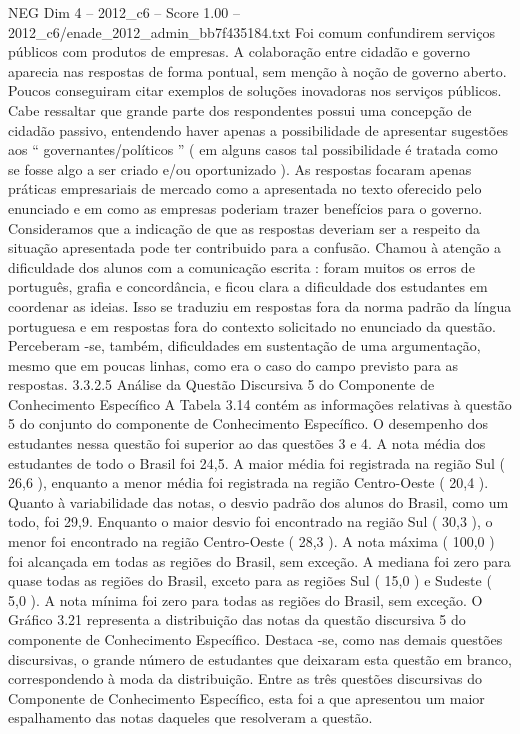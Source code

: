 \begin{textsample}{NEG Dim 4 – 2012\_c6 – Score 1.00 – 2012\_c6/enade\_2012\_admin\_bb7f435184.txt}
Foi comum confundirem serviços públicos com produtos de empresas.
A colaboração entre cidadão e governo aparecia nas respostas de forma pontual, sem menção à noção de governo aberto.
Poucos conseguiram citar exemplos de soluções inovadoras nos serviços públicos.
Cabe ressaltar que grande parte dos respondentes possui uma concepção de cidadão passivo, entendendo haver apenas a possibilidade de apresentar sugestões aos “ governantes/políticos ” ( em alguns casos tal possibilidade é tratada como se fosse algo a ser criado e/ou oportunizado ).
As respostas focaram apenas práticas empresariais de mercado como a apresentada no texto oferecido pelo enunciado e em como as empresas poderiam trazer benefícios para o governo.
Consideramos que a indicação de que as respostas deveriam ser a respeito da situação apresentada pode ter contribuido para a confusão.
Chamou à atenção a dificuldade dos alunos com a comunicação escrita : foram muitos os erros de português, grafia e concordância, e ficou clara a dificuldade dos estudantes em coordenar as ideias.
Isso se traduziu em respostas fora da norma padrão da língua portuguesa e em respostas fora do contexto solicitado no enunciado da questão.
Perceberam -se, também, dificuldades em sustentação de uma argumentação, mesmo que em poucas linhas, como era o caso do campo previsto para as respostas. 3.3.2.5 Análise da Questão Discursiva 5 do Componente de Conhecimento Específico A Tabela 3.14 contém as informações relativas à questão 5 do conjunto do componente de Conhecimento Específico.
O desempenho dos estudantes nessa questão foi superior ao das questões 3 e 4.
A nota média dos estudantes de todo o Brasil foi 24,5.
A maior média foi registrada na região Sul ( 26,6 ), enquanto a menor média foi registrada na região Centro-Oeste ( 20,4 ).
Quanto à variabilidade das notas, o desvio padrão dos alunos do Brasil, como um todo, foi 29,9.
Enquanto o maior desvio foi encontrado na região Sul ( 30,3 ), o menor foi encontrado na região Centro-Oeste ( 28,3 ).
A nota máxima ( 100,0 ) foi alcançada em todas as regiões do Brasil, sem exceção.
A mediana foi zero para quase todas as regiões do Brasil, exceto para as regiões Sul ( 15,0 ) e Sudeste ( 5,0 ).
A nota mínima foi zero para todas as regiões do Brasil, sem exceção.
O Gráfico 3.21 representa a distribuição das notas da questão discursiva 5 do componente de Conhecimento Específico.
Destaca -se, como nas demais questões discursivas, o grande número de estudantes que deixaram esta questão em branco, correspondendo à moda da distribuição.
Entre as três questões discursivas do Componente de Conhecimento Específico, esta foi a que apresentou um maior espalhamento das notas daqueles que resolveram a questão.

\end{textsample}
